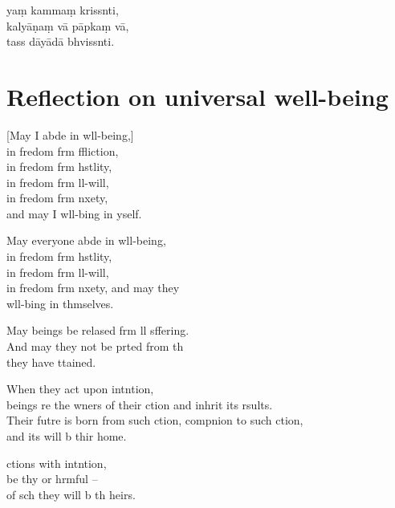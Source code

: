 yaṃ kammaṃ krissnti,\\
kalyāṇaṃ vā pāpkaṃ vā,\\
tass dāyādā bhvissnti.

\clearpage

\chapter[Universal well-being]{Reflection on universal well-being}%

\begin{leader}
\end{leader}

[May I abde in wll-being,]\\
in fredom frm ffliction,\\
in fredom frm hstlity,\\
in fredom frm ll-will,\\
in fredom frm nxety,\\
and may I  wll-bing in yself.

May everyone abde in wll-being,\\
in fredom frm hstlity,\\
in fredom frm ll-will,\\
in fredom frm nxety, and may they\\
 wll-bing in thmselves.

May  beings be relased frm ll sffering.\\
And may they not be prted from th\\
 they have ttained.

When they act upon intntion,\\
 beings re the wners of their ction and inhrit its rsults.\\
Their futre is born from such ction, compnion to such ction,\\
and its  will b thir home.

 ctions with intntion,\\
be thy  or hrmful --\\
of sch  they will b th heirs.

